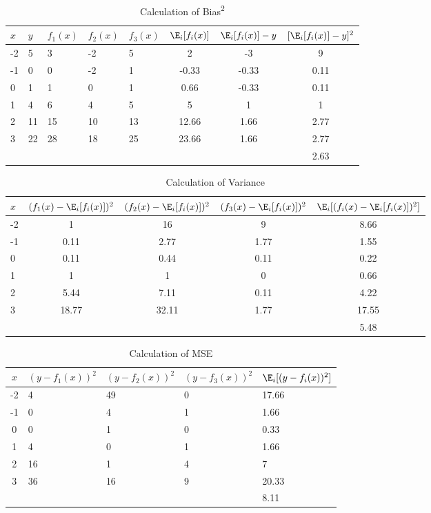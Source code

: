 \documentclass[a4paper]{myarticle}
\begin{document}
\begin{table}[H]
\centering
\renewcommand{\arraystretch}{1.5}
\begin{tabularx}{\linewidth}{LLLLLccc}
\hline
$x$ & $y$ & $f_1(x)$ & $f_2(x)$ & $f_3(x)$ & $\E_i[f_i(x)]$ & $\E_i[f_i(x)] - y$ & $[\E_i[f_i(x)] - y]^2$ \\
 & 5 & 3 & -2 & 5 & 2 & -3 & 9 \\
-1 & 0 & 0 & -2 & 1 & -0.33 & -0.33 & 0.11 \\
0 & 1 & 1 & 0 & 1 & 0.66 & -0.33 & 0.11 \\
1 & 4 & 6 & 4 & 5 & 5 & 1 & 1 \\
2 & 11 & 15 & 10 & 13 & 12.66 & 1.66 & 2.77 \\
3 & 22 & 28 & 18 & 25 & 23.66 & 1.66 & 2.77 \\
\hline
& & & & & & & 2.63 \\
\hline
\end{tabularx}
\caption{Calculation of Bias\textsuperscript{2}}
\label{tab:q2a}
\end{table}

\begin{table}[H]
\centering
\renewcommand{\arraystretch}{1.5}
\begin{tabularx}{\linewidth}{Lcccc}
\hline
$x$ & $(f_1(x) - \E_i[f_i(x)])^2$ & $(f_2(x) - \E_i[f_i(x)])^2$ & $(f_3(x) - \E_i[f_i(x)])^2$ & $\E_i[(f_i(x) - \E_i[f_i(x)])^2]$ \\
 & 1 & 16 & 9 & 8.66 \\
-1 & 0.11 & 2.77 & 1.77 & 1.55 \\
0 & 0.11 & 0.44 & 0.11 & 0.22 \\
1 & 1 & 1 & 0 & 0.66 \\
2 & 5.44 & 7.11 & 0.11 & 4.22 \\
3 & 18.77 & 32.11 & 1.77 & 17.55 \\
\hline
& & & & 5.48 \\
\hline
\end{tabularx}
\caption{Calculation of Variance}
\label{tab:q2b}
\end{table}

\begin{table}[H]
\centering
\renewcommand{\arraystretch}{1.5}
\begin{tabularx}{\linewidth}{cLLLL}
\hline
$x$ & $(y - f_1(x))^2$ & $(y - f_2(x))^2$ & $(y - f_3(x))^2$ & $\E_i[(y - f_i(x))^2]$ \\
 & 4 & 49 & 0 & 17.66 \\
-1 & 0 & 4 & 1 & 1.66 \\
0 & 0 & 1 & 0 & 0.33 \\
1 & 4 & 0 & 1 & 1.66 \\
2 & 16 & 1 & 4 & 7 \\
3 & 36 & 16 & 9 & 20.33 \\
\hline
& & & & 8.11 \\
\hline
\end{tabularx}
\caption{Calculation of MSE}
\label{tab:q2c}
\end{table}
\end{document}
